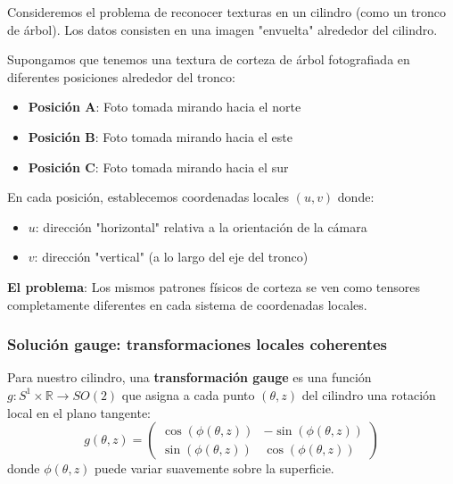 Consideremos el problema de reconocer texturas en un cilindro (como un tronco de árbol). Los datos consisten en una imagen "envuelta" alrededor del cilindro.

\begin{example}
Supongamos que tenemos una textura de corteza de árbol fotografiada en diferentes posiciones alrededor del tronco:
\begin{itemize}
    \item \textbf{Posición A}: Foto tomada mirando hacia el norte
    \item \textbf{Posición B}: Foto tomada mirando hacia el este  
    \item \textbf{Posición C}: Foto tomada mirando hacia el sur
\end{itemize}

En cada posición, establecemos coordenadas locales $(u,v)$ donde:
\begin{itemize}
    \item $u$: dirección "horizontal" relativa a la orientación de la cámara
    \item $v$: dirección "vertical" (a lo largo del eje del tronco)
\end{itemize}

\textbf{El problema}: Los mismos patrones físicos de corteza se ven como tensores completamente diferentes en cada sistema de coordenadas locales.
\end{example}

\subsubsection{Solución gauge: transformaciones locales coherentes}

\begin{definition}
Para nuestro cilindro, una \textbf{transformación gauge} es una función $g: S^1 \times \mathbb{R} \to SO(2)$ que asigna a cada punto $(\theta, z)$ del cilindro una rotación local en el plano tangente:
\begin{equation}
g(\theta, z) = \begin{pmatrix}
\cos(\phi(\theta, z)) & -\sin(\phi(\theta, z)) \\
\sin(\phi(\theta, z)) & \cos(\phi(\theta, z))
\end{pmatrix}
\end{equation}
donde $\phi(\theta, z)$ puede variar suavemente sobre la superficie.
\end{definition}

